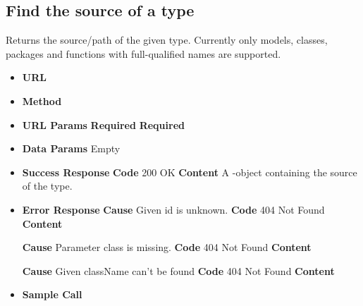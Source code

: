 \subsection{Find the source of a type}
Returns the source/path of the given type.
Currently only models, classes, packages and functions with full-qualified names are supported.
\begin{itemize}
\item \textbf{URL} 
\item \textbf{Method} 

\item \textbf{URL Params}
  \newline\textbf{Required} 
  \newline\textbf{Required} 

\item \textbf{Data Params} Empty

\item \textbf{Success Response}
  \newline\textbf{Code} 200 OK
  \newline\textbf{Content} A -object containing the source of the type.

\item \textbf{Error Response}
  \newline\textbf{Cause} Given id is unknown.
  \newline\textbf{Code} 404 Not Found
  \newline\textbf{Content} 

  \fixedspace\textbf{Cause} Parameter class is missing.
  \newline\textbf{Code} 404 Not Found
  \newline\textbf{Content} 

  \fixedspace\textbf{Cause} Given className can't be found
  \newline\textbf{Code} 404 Not Found
  \newline\textbf{Content} 

\item \textbf{Sample Call}
\end{itemize}
